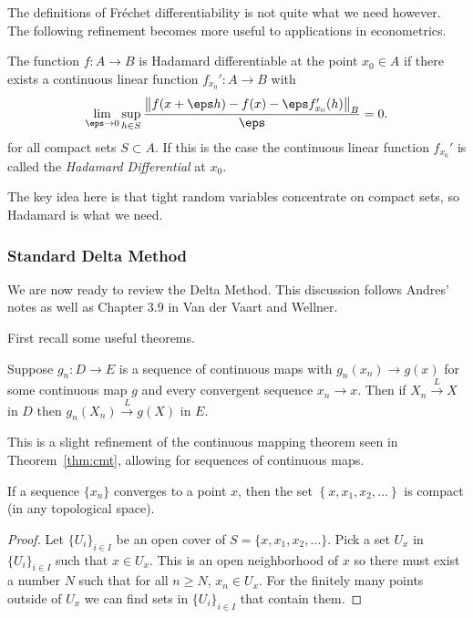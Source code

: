 The definitions of Fréchet differentiability is not quite what we need however. The following refinement becomes more useful to applications in econometrics.

\begin{definition}
	\label{def:hadamard}
	The function \(f:A\to B\) is Hadamard differentiable at the point \(x_0\in A\) if there exists a continuous linear function \(f_{x_0}': A \to B\) with 
	\[
		\lim_{\eps\to 0}\sup_{h\in S} \frac{\left\|f(x+\eps h)-f(x)- \eps f_{x_0}'(h)\right\|_B}{\eps} =0
	.\]
	for all compact sets \(S\subset A\). If this is the case the continuous linear function \(f_{x_0}'\) is called the \textit{Hadamard Differential} at \(x_0\). 
\end{definition}

The key idea here is that tight random variables concentrate on compact sets, so Hadamard is what we need.

\subsubsection{Standard Delta Method}%
\label{subsubsec:standard-delta-method}

We are now ready to review the Delta Method. This discussion follows Andres' notes as well as Chapter 3.9 in Van der Vaart and Wellner. 

First recall some useful theorems.

\begin{theorem}
	\label{thm:cmt-2}
	Suppose \(g_n:D\to E\) is a sequence of continuous maps with \(g_n(x_n)\to g(x)\) for some continuous map \(g\) and every convergent sequence \(x_n \to x\). Then if \(X_n\overset{L}{\to} X\)	in \(D\) then  \(g_n(X_n)\overset{L}{\to} g(X )\) in \(E\).
\end{theorem}

This is a slight refinement of the continuous mapping theorem seen in Theorem~\ref{thm:cmt}, allowing for sequences of continuous maps.
\begin{lemma}
	\label{lemma:convergent-compact}
	If a sequence \(\{x_n\}\) converges to a point \(x\), then the set  \( \left\{x,x_1,x_2,\dots\right\}\) is compact (in any topological space).
\end{lemma}
\begin{proof}
	Let \(\{U_i\}_{i\in I}\) be an open cover of \(S = \{x,x_1,x_2,\dots\} \). Pick a set \(U_x\) in  \(\{U_i\}_{i\in I}\) such that \(x\in U_x\). This is an open neighborhood of \(x\) so there must exist a number \(N\) such that for all \(n \geq N\), \(x_n \in U_x\). For the finitely many points outside of  \(U_x\) we can find sets in \(\{U_i\}_{i\in I}\) that contain them. 
\end{proof}

